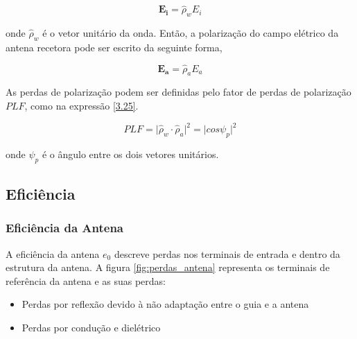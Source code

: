 \begin{equation} \label{3.23}
\mathbf{E_{i}}=\hat{\rho}_{w}E_{i}
\end{equation}

onde $\hat{\rho}_{w}$ é o vetor unitário da onda. Então, a polarização do campo elétrico da antena recetora pode ser escrito da seguinte forma,

\begin{equation} \label{3.24}
\mathbf{E_{a}}=\hat{\rho}_{a}E_{a}
\end{equation}

As perdas de polarização podem ser definidas pelo fator de perdas de polarização $PLF$, como na expressão \ref{3.25}.

\begin{equation} \label{3.25}
PLF=\vert\hat{\rho}_{w}\cdot \hat{\rho}_{a}\vert^{2}=\vert cos\psi_{p}\vert^{2}
\end{equation}

onde $\psi_{p}$ é o ângulo entre os dois vetores unitários.




\subsection*{Eficiência}
\subsubsection*{Eficiência da Antena}
A eficiência da antena $e_{0}$ descreve perdas nos terminais de entrada e dentro da estrutura da antena. A figura \ref{fig:perdas_antena} representa os terminais de referência da antena e as suas perdas: \begin{itemize}
\item Perdas por reflexão devido à não adaptação entre o guia e a antena
\item Perdas por condução e dielétrico
\end{itemize}

